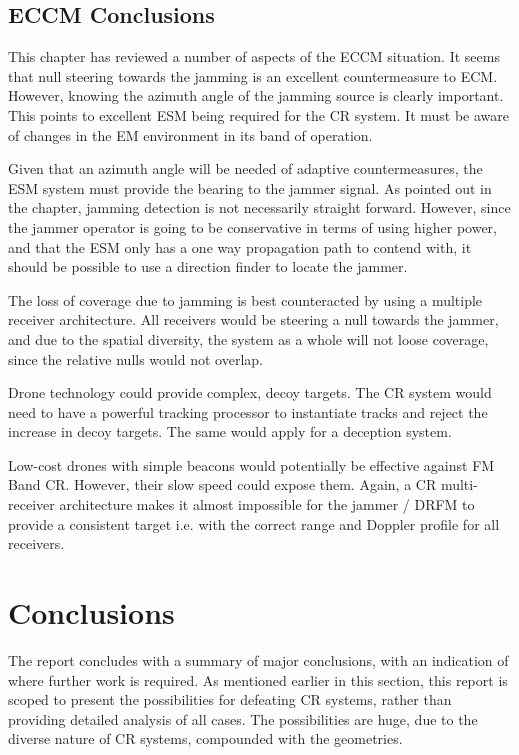 \documentclass[english, 12pt]{report}
\begin{document}
\section{ECCM Conclusions}

This chapter has reviewed a number of aspects of the ECCM situation. It seems that null steering towards the jamming is an excellent countermeasure to ECM. However, knowing the azimuth angle of the jamming source is clearly important. This points to excellent ESM being required for the CR system. It must be aware of changes in the EM environment in its band of operation. 

Given that an azimuth angle will be needed of adaptive countermeasures, the ESM system must provide the bearing to the jammer signal. As pointed out in the chapter, jamming detection is not necessarily straight forward. However, since the jammer operator is going to be conservative in terms of using higher power, and that the ESM only has a one way propagation path to contend with, it should be possible to use a direction finder to locate the jammer.

The loss of coverage due to jamming is best counteracted by using a multiple receiver architecture. All receivers would be steering a null towards the jammer, and due to the spatial diversity, the system as a whole will not loose coverage, since the relative nulls would not overlap.

Drone technology could provide complex, decoy targets. The CR system would need to have a powerful tracking processor to instantiate tracks and reject the increase in decoy targets. The same would apply for a deception system. 

Low-cost drones with simple beacons would potentially be effective against FM Band CR. However, their slow speed could expose them. Again, a CR multi-receiver architecture makes it almost impossible for the jammer / DRFM to provide a consistent target i.e. with the correct range and Doppler profile for all receivers.





\chapter{Conclusions}

The report concludes with a summary of major conclusions, with an indication of where further work is required. As mentioned earlier in this section, this report is scoped to present the possibilities for defeating CR systems, rather than providing detailed analysis of all cases. The possibilities are huge, due to the diverse nature of CR systems, compounded with the geometries.
\end{document}
